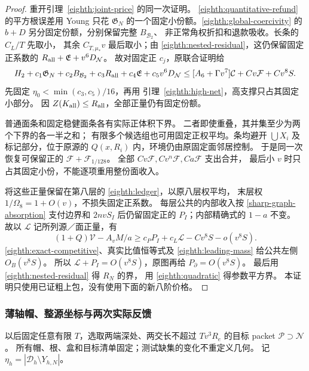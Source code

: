 \begin{proof}
重开引理~\ref{eighth:joint-price} 的同一次证明。
\eqref{eighth:quantitative-refund} 的平方根误差用 Young 只花
\(\mathfrak G_N\) 的一个固定小份额。\eqref{eighth:global-coercivity}
的 \(b+D\) 另分固定份额，分别保留完整 \(B_{\mathcal B_2}\)、
非正常角权折扣和退款吸收。长条的 \(C_L/T\) 先取小，
其余 \(C_{T,\mu_*}v\) 最后取小；由
\eqref{eighth:nested-residual}，这仍保留固定正系数的
\(R_{\rm all}+\mathfrak E+v^6D_{\mathcal N}\)。
故对固定正 \(c_j\)，原联合证明给
\[
 H_2+c_1\mathfrak G_N+c_2B_{\mathcal B_2}
 +c_3R_{\rm all}+c_4\mathfrak E+c_5v^6D_{\mathcal N}
 \le[A_6+\Gamma v^7]\mathcal C+Cv\mathcal F+Cv^8S.
\]
先固定 \(\eta_0<\min(c_3,c_5)/16\)，再用
引理~\ref{eighth:high-net}，高支撑只占其固定小部分。
因 \(Z(K_{\rm all})\le R_{\rm all}\)，全部正量仍有固定份额。

普通面条和固定稳健面条各有实际正体积下界。
二者即使重叠，其并集至少为两个下界的各一半之和；
有限多个候选组也可用固定正权平均。条均避开 \(\bigcup X_i\)
及标记部分，位于原源的 \(Q(x,R_i)\) 内，环境仍由原固定面邻居控制。
于是同一次恢复可保留正的 \(\mathcal F+\mathcal F_{1/128}\)。
全部 \(Cv\mathcal F,Cv^n\mathcal F,Ca\mathcal F\) 支出合并，
最后小 \(v\) 时只占其固定小份，不能逐项重用整份面收入。

将这些正量保留在第八层的 \eqref{eighth:ledger}，以原八层权平均，
末层权 \(1/\Omega_8=1+O(v)\)，不损失固定正系数。
每层公共的内部收入按 \eqref{sharp-graph-absorption} 支付边界和
\(2nvS_I\) 后仍留固定正的 \(P_I\)；内部精确式的 \(1-a\) 不变。
故以 \(\mathcal L\) 记所列源／面正量，有
\[
 (1+Q)\mathcal V-A_vM/a
 \ge c_PP_I+c_L\mathcal L-Cv^8S-o(v^8S).
\]
\eqref{eighth:exact-competitive}、真实比值恒等式及
\eqref{eighth:leading-mass} 给公共左侧 \(O_B(v^8S)\)。
所以 \(\mathcal L+P_I=O(v^8S)\)，原图再给 \(P_\partial=O(v^8S)\)。
最后用 \eqref{eighth:nested-residual} 得 \(R_N\) 的界，
用 \eqref{eighth:quadratic} 得参数平方界。
本证明只使用已证粗上包，没有使用下面的新八阶价格。
\end{proof}

\subsubsection{薄轴帽、整源坐标与两次实际反馈}

以后固定任意有限 \(T\)，选取两端深处、两交长不超过
\(Tv^3R_e\) 的目标 packet \(\mathscr P\supset\mathcal N\)。
所有帽、根、盒和目标清单固定；测试缺集的变化不重定义几何。
记 \(\eta_h=|\mathscr D_h\setminus Y_{h,N}|\)。

